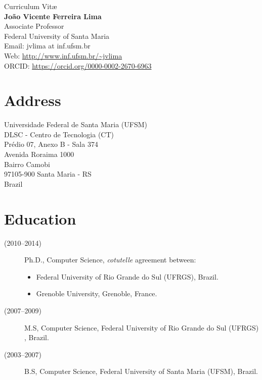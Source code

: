 \documentclass[11pt,a4paper]{article}
\begin{document}
\begin{center}
{\sc\Large Curriculum Vit\ae}\\
\vspace{2mm}
{\bf\large João Vicente Ferreira Lima}\\
\vspace{2mm}
Associate Professor\\
Federal University of Santa Maria\\
Email: jvlima at inf.ufsm.br\\
Web: {\small \url{http://www.inf.ufsm.br/~jvlima}} \\
ORCID: {\small \url{https://orcid.org/0000-0002-2670-6963}}
\end{center}

\section{Address}

\begin{flushleft}
Universidade Federal de Santa Maria (UFSM)\\
DLSC - Centro de Tecnologia (CT)\\
Prédio 07, Anexo B - Sala 374 \\
Avenida Roraima 1000\\
Bairro Camobi\\
97105-900 Santa Maria - RS\\
Brazil
\end{flushleft}
 
\section{Education}

\begin{description}
\item[(2010--2014)] Ph.D., Computer Science, \emph{cotutelle} agreement between:
	\begin{itemize}
	\item Federal University of Rio Grande do Sul (UFRGS), Brazil.
	\item Grenoble University, Grenoble, France.
	\end{itemize}
\item[(2007--2009)] M.S, Computer Science, Federal University of Rio Grande do Sul (UFRGS) , Brazil.
\item[(2003--2007)] B.S, Computer Science, Federal University of Santa Maria (UFSM), Brazil.
\end{description}
\end{document}
